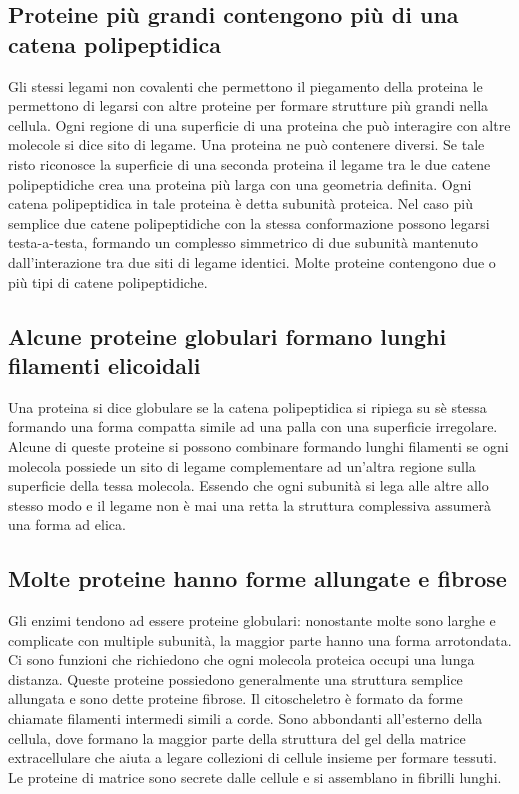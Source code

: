 \subsection{Proteine pi\`u grandi contengono pi\`u di una catena polipeptidica}
Gli stessi legami non covalenti che permettono il piegamento della proteina le permettono di legarsi con altre proteine per formare strutture pi\`u grandi nella cellula. Ogni regione di
una superficie di una proteina che pu\`o interagire con altre molecole si dice sito di legame. Una proteina ne pu\`o contenere diversi. Se tale risto riconosce la superficie di una 
seconda proteina il legame tra le due catene polipeptidiche crea una proteina pi\`u larga con una geometria definita. Ogni catena polipeptidica in tale proteina \`e detta subunit\`a 
proteica. Nel caso pi\`u semplice due catene polipeptidiche con la stessa conformazione possono legarsi testa-a-testa, formando un complesso simmetrico di due subunit\`a mantenuto 
dall'interazione tra due siti di legame identici. Molte proteine contengono due o pi\`u tipi di catene polipeptidiche.
\subsection{Alcune proteine globulari formano lunghi filamenti elicoidali}
Una proteina si dice globulare se la catena polipeptidica si ripiega su s\`e stessa formando una forma compatta simile ad una palla con una superficie irregolare. Alcune di queste 
proteine si possono combinare formando lunghi filamenti se ogni molecola possiede un sito di legame complementare ad un'altra regione sulla superficie della tessa molecola. Essendo che
ogni subunit\`a si lega alle altre allo stesso modo e il legame non \`e mai una retta la struttura complessiva assumer\`a una forma ad elica. 
\subsection{Molte proteine hanno forme allungate e fibrose}
Gli enzimi tendono ad essere proteine globulari: nonostante molte sono larghe e complicate con multiple subunit\`a, la maggior parte hanno una forma arrotondata. Ci sono funzioni che
richiedono che ogni molecola proteica occupi una lunga distanza. Queste proteine possiedono generalmente una struttura semplice allungata e sono dette proteine fibrose. Il citoscheletro
\`e formato da forme chiamate filamenti intermedi simili a corde. Sono abbondanti all'esterno della cellula, dove formano la maggior parte della struttura del gel della matrice
extracellulare che aiuta  a legare collezioni di cellule insieme per formare tessuti. Le proteine di matrice sono secrete dalle cellule e si assemblano in fibrilli lunghi.
